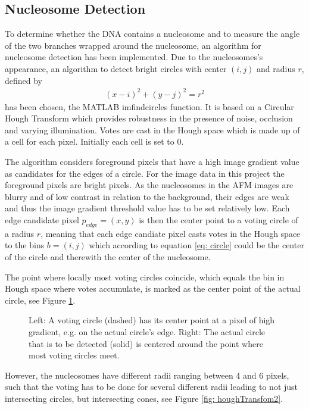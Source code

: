 \documentclass{article}
\begin{document}
\subsection{Nucleosome Detection}\label{sec:Nucleosome Detection}
To determine whether the DNA contains a nucleosome and to measure the angle of the two branches wrapped around the nucleosome, an algorithm for nucleosome detection has been implemented. Due to the nucleosomes's appearance, an algorithm to detect bright circles with center $(i,j)$ and radius $r$, defined by
\begin{align}\label{eq: circle}
(x -i)^2+(y-j)^2 = r^2 
\end{align}
has been chosen, the MATLAB imfindcircles function. It is based on a Circular Hough Transform which provides robustness in the presence of noise, occlusion and varying illumination. Votes are cast in the Hough space which is made up of a cell for each pixel. Initially each cell is set to 0.

The algorithm considers foreground pixels that have a high image gradient value as candidates for the edges of a circle. For the image data in this project the foreground pixels are bright pixels. As the nucleosomes in the AFM images are blurry and of low contrast in relation to the background, their edges are weak and thus the image gradient threshold value has to be set relatively low. Each edge candidate pixel $p_{edge}=(x,y)$ is then the center point to a voting circle of a radius $r$, meaning that each edge candiate pixel casts votes in the Hough space to the bins $b = (i,j)$ which according to equation \ref{eq: circle} could be the center of the circle and therewith the center of the nucleosome.

The point where locally most voting circles coincide, which equals the bin in Hough space where votes accumulate, is marked as the center point of the actual circle, see Figure \ref{fig: houghTransfom1}. 

\begin{figure}[htb!]
\centering
\def\svgwidth{0.95\textwidth}

\caption{Left: A voting circle (dashed) has its center point at a pixel of high gradient, e.g. on the actual circle's edge. Right: The actual circle that is to be detected (solid) is centered around the point where most voting circles meet.}\label{fig: houghTransfom1}
\end{figure}

However, the nucleosomes have different radii ranging between 4 and 6 pixels, such that the voting has to be done for several different radii leading to not just intersecting circles, but intersecting cones, see Figure \ref{fig: houghTransfom2}.
\end{document}
